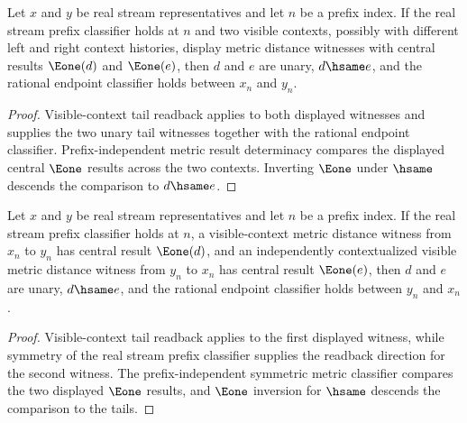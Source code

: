 \begin{theorem}
\label{thm:completion-metric-distance-visible-context-e1-prefix-independent-tail-deterministic}
Let $x$ and $y$ be real stream representatives and let $n$ be a prefix
index. If the real stream prefix classifier holds at $n$ and two visible
contexts, possibly with different left and right context histories, display
metric distance witnesses with central results $\Eone(d)$ and $\Eone(e)$,
then $d$ and $e$ are unary, $d\hsame e$, and the rational endpoint classifier
holds between $x_n$ and $y_n$.
\end{theorem}
\begin{proof}
Visible-context tail readback applies to both displayed witnesses and supplies
the two unary tail witnesses together with the rational endpoint classifier.
Prefix-independent metric result determinacy compares the displayed central
$\Eone$ results across the two contexts. Inverting $\Eone$ under $\hsame$
descends the comparison to $d\hsame e$.
\end{proof}

\begin{theorem}
\label{thm:completion-metric-distance-visible-context-e1-prefix-independent-symmetric-tail-readback}
Let $x$ and $y$ be real stream representatives and let $n$ be a prefix
index. If the real stream prefix classifier holds at $n$, a visible-context
metric distance witness from $x_n$ to $y_n$ has central result $\Eone(d)$,
and an independently contextualized visible metric distance witness from
$y_n$ to $x_n$ has central result $\Eone(e)$, then $d$ and $e$ are unary,
$d\hsame e$, and the rational endpoint classifier holds between $y_n$ and
$x_n$.
\end{theorem}
\begin{proof}
Visible-context tail readback applies to the first displayed witness, while
symmetry of the real stream prefix classifier supplies the readback direction
for the second witness. The prefix-independent symmetric metric classifier
compares the two displayed $\Eone$ results, and $\Eone$ inversion for
$\hsame$ descends the comparison to the tails.
\end{proof}

